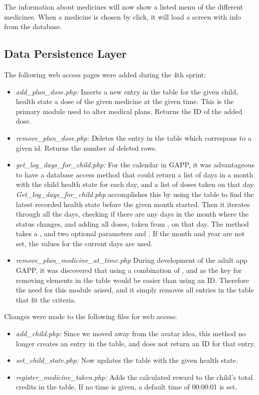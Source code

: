 The information about medicines will now show a listed menu of the different medicines. When a
medicine is chosen by click, it will load a screen with info from the database.

\subsection{Data Persistence Layer}
The following web access pages were added during the 4th sprint:
\begin{itemize}
  \item \emph{add\_plan\_dose.php:} Inserts a new entry in the  table for the given child, health state a dose 
  		of the given medicine at the given time. This is the primary module used to alter medical plans. Returns the ID of the
  		added dose.
  \item \emph{remove\_plan\_dose.php:} Deletes the entry in the table  which correspons to a given id. Returns
  		the number of deleted rows.
  \item \emph{get\_log\_days\_for\_child.php:} For the calendar in GAPP, it was advantageous to have a database access method that
  		could return a list of days in a month with the child health state for each day, and a list of doses taken on that day.
  		\emph{Get\_log\_days\_for\_child.php} accomplishes this by using the table  to find the latest recorded
  		health state before the given month started. Then it iterates through all the days, checking if there are any days in the month
  		where the status changes, and adding all doses, taken from , on that day. The method takes a ,
  		and two optional parameters  and . If the month and year are not set, the values for the current days
  		are used.
  \item \emph{remove\_plan\_medicine\_at\_time.php} During development of the adult app GAPP, it was discovered that using a
  		combination of ,  and  as the key for removing elements in the 
  		table would be easier than using an ID. Therefore the need for this module arised, and it simply removes all entries in the
  		table that fit the criteria.
\end{itemize}

Changes were made to the following files for web access:
\begin{itemize}
  \item \emph{add\_child.php:} Since we moved away from the avatar idea, this method no longer creates an entry in the  table, and does
  		not return an ID for that entry. 
  \item \emph{set\_child\_state.php:} Now updates the table  with the given health state.
  \item \emph{register\_medicine\_taken.php:} Adds the calculated reward to the child's total credits in the  table. If 
  		no time is given, a default time of 00:00:01 is set.
\end{itemize}

